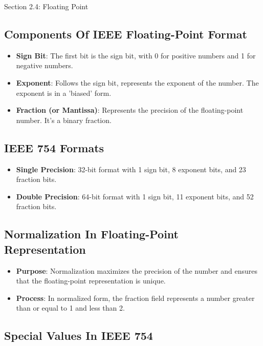 \begin{notes}{Section 2.4: Floating Point}
    \subsection*{Components Of IEEE Floating-Point Format}
    
    \begin{itemize}
        \item \textbf{Sign Bit}: The first bit is the sign bit, with 0 for positive numbers and 1 for negative numbers.
        \item \textbf{Exponent}: Follows the sign bit, represents the exponent of the number. The exponent is in a 'biased' form.
        \item \textbf{Fraction (or Mantissa)}: Represents the precision of the floating-point number. It's a binary fraction.
    \end{itemize}
    
    \subsection*{IEEE 754 Formats}
    
    \begin{itemize}
        \item \textbf{Single Precision}: 32-bit format with 1 sign bit, 8 exponent bits, and 23 fraction bits.
        \item \textbf{Double Precision}: 64-bit format with 1 sign bit, 11 exponent bits, and 52 fraction bits.
    \end{itemize}
    
    \subsection*{Normalization In Floating-Point Representation}
    
    \begin{itemize}
        \item \textbf{Purpose}: Normalization maximizes the precision of the number and ensures that the floating-point representation is unique.
        \item \textbf{Process}: In normalized form, the fraction field represents a number greater than or equal to 1 and less than 2.
    \end{itemize}
    
    \subsection*{Special Values In IEEE 754}
    

\end{notes}
